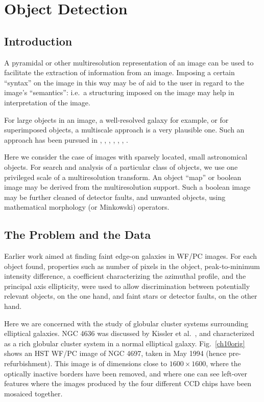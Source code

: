 \section{Object Detection}

\subsection{Introduction}

A pyramidal or other multiresolution representation of an image can be used
to facilitate the extraction of information from an image.  Imposing a 
certain ``syntax'' on the image in this way may be of aid to the user in 
regard to the image's ``semantics'': i.e.\ a structuring imposed on the image
may help in interpretation of the image.

For large objects in an image, a well-resolved galaxy for example, or for
superimposed objects, a multiscale approach is a very plausible one.  Such 
an approach has been pursued in \cite{bijaoui89}, \cite{bijaoui90},
 \cite{bijaoui91a}, \cite{BIJAOUI93},  
\cite{bijaoui94_1}, \cite{slezak90}, \cite{slezak93}.

Here we consider the case of images with sparsely located, small astronomical
objects.  For search and analysis of a particular class of objects, we 
use one privileged scale of a multiresolution transform.  An object ``map''
or boolean image may be derived from the multiresolution support.  Such a 
boolean image may be further cleaned of detector faults, and unwanted objects,
using mathematical morphology (or Minkowski) operators.  

\subsection{The Problem and the Data}

Earlier work \cite{meurs94} aimed at finding faint edge-on galaxies 
in WF/PC images.  For each object found, properties such as number of pixels
in the object,  peak-to-minimum
intensity difference, a coefficient characterizing the azimuthal profile, and
the principal axis ellipticity, were used to allow discrimination between 
potentially relevant objects, on the one hand, and faint stars or detector
faults, on the other hand.

Here we are concerned with the study of globular cluster systems surrounding
elliptical galaxies.  
NGC 4636 was discussed by Kissler et al.\ \cite{kissler93}, 
and characterized as a rich
globular cluster system in a normal elliptical galaxy.
Fig.\ \ref{ch10orig} shows an HST WF/PC image of NGC 4697, taken in 
May 1994 (hence pre-refurbishment).  This image is of dimensions close to 
$1600 \times 1600$, where the optically inactive borders have been removed,
and where one can see left-over features where the images produced by the 
four different CCD chips have been mosaiced together.  

